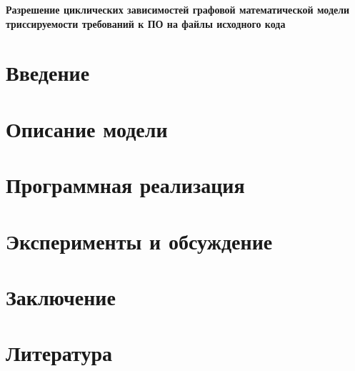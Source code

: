 \documentclass{article}
\begin{document}
    \begin{center}
    \Large
    \textbf{Разрешение циклических зависимостей графовой математической модели триссируемости требований к ПО на файлы исходного кода}
    \end{center}


    \section*{Введение}
    

    \section*{Описание модели}
    

    \section*{Программная реализация}
    

    \section*{Эксперименты и обсуждение}
    

    \section*{Заключение}
    

    \section*{Литература}
    
\end{document}
